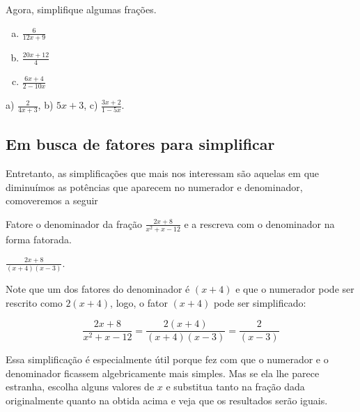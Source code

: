 \documentclass[main.tex]{subfiles}
\begin{document}
\paraAmbos

\begin{questao}
Agora, simplifique algumas frações.
\begin{enumerate}[a)]
\item $\frac{6}{12x+9}$
\item $\frac{20x+12}{4}$
\item $\frac{6x+4}{2-10x}$
\end{enumerate}
\end{questao}

\begin{gabarito}
	\begin{gabaritoQuestao}
		a) $\frac{2}{4x+3}$, b) $5x+3$, c) $\frac{3x+2}{1-5x}$.
	\end{gabaritoQuestao}
\end{gabarito}

\subsection*{Em busca de fatores para simplificar}

Entretanto, as simplificações que mais nos interessam são aquelas em que diminuímos as potências que aparecem no numerador e denominador, comoveremos a seguir 

\begin{questao}
Fatore o denominador da fração $\frac{2x+8}{x^2+x-12}$ e a rescreva com o denominador na forma fatorada. 
\end{questao}

\begin{gabarito}
	\begin{gabaritoQuestao}
		$\frac{2x+8}{(x+4)(x-3)}$.
	\end{gabaritoQuestao}
\end{gabarito}

Note que um dos fatores do denominador é $(x+4)$ e que o numerador pode ser rescrito como $2(x+4)$, logo, o fator $(x+4)$ pode ser simplificado:

$$\frac{2x+8}{x^2+x-12} = \frac{2(x+4)}{(x+4)(x-3)} = \frac{2}{(x-3)}$$

Essa simplificação é especialmente útil porque fez com que o numerador e o denominador ficassem algebricamente mais simples. Mas se ela lhe parece estranha, escolha alguns valores de $x$ e substitua tanto na fração dada originalmente quanto na obtida acima e veja que os resultados serão iguais.
\end{document}

